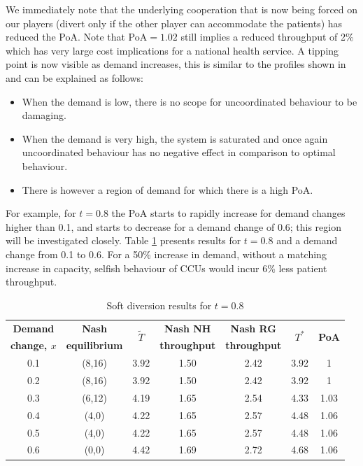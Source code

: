 \documentclass{article}
\begin{document}
We immediately note that the underlying cooperation that is now being forced on our players (divert only if the other player can accommodate the patients) has reduced the PoA.
Note that PoA$=1.02$ still implies a reduced throughput of 2\% which has very large cost implications for a national health service.
A tipping point is now visible as demand increases, this is similar to the profiles shown in \cite{Knight2013} and can be explained as follows:

\begin{itemize}
    \item When the demand is low, there is no scope for uncoordinated behaviour to be damaging.
    \item When the demand is very high, the system is saturated and once again uncoordinated behaviour has no negative effect in comparison to optimal behaviour.
    \item There is however a region of demand for which there is a high PoA.
\end{itemize}

For example, for $t=0.8$ the PoA starts to rapidly increase for demand changes higher than 0.1, and starts to decrease for a demand change of 0.6; this region will be investigated closely.
Table \ref{table_model2_target_demand} presents results for $t=0.8$ and a demand change from 0.1 to 0.6. For a 50\% increase in demand, without a matching increase in capacity, selfish behaviour of CCUs would incur 6\% less patient throughput.

 \begin{table}[!htbp]
\begin{center}
\begin{tabular}{|c|c|c|c|c|c|c|}
\hline
\textbf{Demand}&\textbf{Nash}&\multirow{2}{*}{\textbf{$\widetilde T$}}&\textbf{Nash NH}&\textbf{Nash RG}&\multirow{2}{*}{\textbf{$T^*$}}&\multirow{2}{*}{\textbf{PoA}}\\
\textbf{change, $x$}&\textbf{equilibrium}&\textbf{ }&\textbf{throughput}&\textbf{throughput}&\textbf{}&\textbf{}\\
\hline
0.1&(8,16)&3.92&1.50&2.42&3.92&1\\
0.2&(8,16)&3.92&1.50&2.42&3.92&1\\
0.3&(6,12)&4.19&1.65&2.54&4.33&1.03\\
0.4&(4,0)&4.22&1.65&2.57&4.48&1.06\\
0.5&(4,0)&4.22&1.65&2.57&4.48&1.06\\
0.6&(0,0)&4.42&1.69&2.72&4.68&1.06\\
\hline
\end{tabular}
\end{center}
\caption{Soft diversion results for $t=0.8$}\label{table_model2_target_demand}
\end{table}
\end{document}
